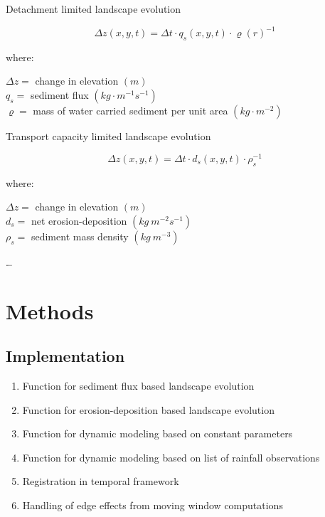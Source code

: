 \documentclass[10pt,letterpaper]{article}
\begin{document}
Detachment limited landscape evolution

\begin{equation}\label{eq:flux_evolution} 
{\Delta z(x,y,t) = \Delta t \cdot q_s(x,y,t) \cdot \varrho(r)^{-1} }
\end{equation}

where: 

$\Delta z =$ change in elevation $(m)$ \\
$q_s =$ sediment flux $(kg \cdot m^{-1} s^{-1})$ \\
$\varrho =$ mass of water carried sediment per unit area $(kg \cdot m^{-2})$ \\
\vspace{1em}

Transport capacity limited landscape evolution

\begin{equation}\label{eq:evolution} 
{\Delta z(x,y,t) = \Delta t \cdot d_s(x,y,t) \cdot \rho_s^{-1} }
\end{equation}

where: 

$\Delta z =$ change in elevation $(m)$ \\
$d_s =$ net erosion-deposition $(kg ~ m^{-2} s^{-1})$ \\
$\rho_s =$ sediment mass density $(kg ~m^{-3})$ \\
\vspace{1em}

\ldots
\cite{mitasova2013}





\section*{Methods}

\subsection*{Implementation}

\begin{enumerate}
\item Function for sediment flux based landscape evolution
\item Function for erosion-deposition based landscape evolution
\item Function for dynamic modeling based on constant parameters
\item Function for dynamic modeling based on list of rainfall observations
\item Registration in temporal framework
\item Handling of edge effects from moving window computations
\end{enumerate}
\end{document}
